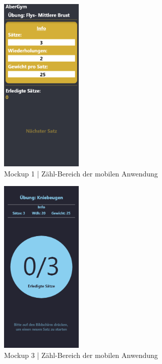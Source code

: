 \begin{figure}[!htb]
    \centering
    \includegraphics[width=0.35\textwidth]{pics/count1.png}
    \caption{Mockup 1 | Zähl-Bereich der mobilen Anwendung}
    \label{fig:count1}
\end{figure}
\begin{figure}[!htb]
    \centering
    \includegraphics[width=0.35\textwidth]{pics/count3.png}
    \caption{Mockup 3 | Zähl-Bereich der mobilen Anwendung}
    \label{fig:count3}
\end{figure}
